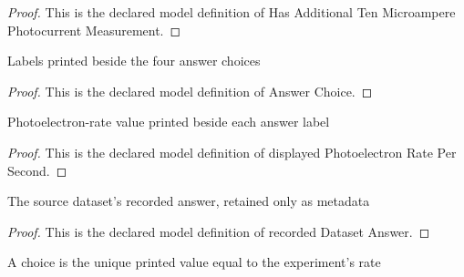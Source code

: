 \begin{proof}
  This is the declared model definition of Has Additional Ten Microampere Photocurrent Measurement.
\end{proof}
\begin{definition}
  \label{def:physics:phyx-mini-0498:phyxminiproblems-problemphyxmini0498-answerchoice}
  Labels printed beside the four answer choices
\end{definition}
\begin{proof}
  This is the declared model definition of Answer Choice.
\end{proof}
\begin{definition}
  \label{def:physics:phyx-mini-0498:phyxminiproblems-problemphyxmini0498-displayedphotoelectronratepersecond}
  Photoelectron-rate value printed beside each answer label
\end{definition}
\begin{proof}
  This is the declared model definition of displayed Photoelectron Rate Per Second.
\end{proof}
\begin{definition}
  \label{def:physics:phyx-mini-0498:phyxminiproblems-problemphyxmini0498-recordeddatasetanswer}
  The source dataset's recorded answer, retained only as metadata
\end{definition}
\begin{proof}
  This is the declared model definition of recorded Dataset Answer.
\end{proof}
\begin{definition}
  \label{def:physics:phyx-mini-0498:phyxminiproblems-problemphyxmini0498-isuniquematchingdisplayedrate}
  A choice is the unique printed value equal to the experiment's rate
\end{definition}
